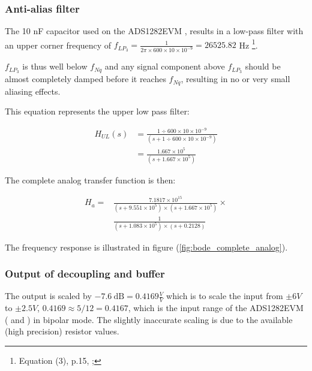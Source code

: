 \documentclass[a4paper]{article}
\begin{document}
  \begin{multicols}{2}

\subsubsection{Anti-alias filter}
The 10 nF capacitor used on the ADS1282EVM
\cite{ads1282evm_ds}, results in a low-pass filter with an upper corner frequency of $f_{LP_3} =
\frac{1}{2 \pi \times 600 \times 10 \times 10^{-9}} = 26525.82 $ Hz
\footnote{Equation (3), p.15, \cite{ads1282_ds}; }.

$f_{LP_3}$ is thus well below $f_{Nq}$ and any signal component above $f_{LP_3}$ should
be almost completely damped before it reaches $f_{Nq}$, resulting in no
or very small aliasing effects.

This equation represents the upper low pass filter:
\begin{center}
\begin{equation}
  \begin{aligned}
  H_{UL}(s) &= \frac{1 \div 600 \times 10 \times 10^{-9}}
                   {(s + 1 \div 600 \times 10 \times 10^{-9})} \\
            &= \frac{1.667 \times 10^5}{(s + 1.667 \times 10^5)}
  \end{aligned}
  \label{eqn:transfer_upper_lowpass}
\end{equation}
\end{center}

The complete analog transfer function is then:
\begin{center}
\begin{equation}
  \begin{aligned}
  H_{a} = &\frac{7.1817 \times 10^{15}}
                { (s + 9.551 \times 10^5) \times
                   (s + 1.667 \times 10^5)
                 } \times \\
          & \frac{1}
                 {(s + 1.083 \times 10^5) \times
                  (s + 0.2128) }
  \end{aligned}
  \label{eqn:transfer_analog}
\end{equation}
\end{center}


The frequency response is illustrated in figure
(\ref{fig:bode_complete_analog}).
\subsubsection{Output of decoupling and buffer} The output is scaled by $-7.6\ \text{dB} =
0.4169 \frac{V}{V}$ which is to scale the input from $\pm 6V$ to $\pm 2.5V$, $0.4169
\approx 5 / 12 = 0.4167$, which is the input range of the ADS1282EVM
(\cite{ads1282evm_ds} and \cite{ads1282_ds}) in bipolar mode. The
slightly inaccurate scaling is due to the available (high precision) resistor values.


\end{multicols}
\end{document}
